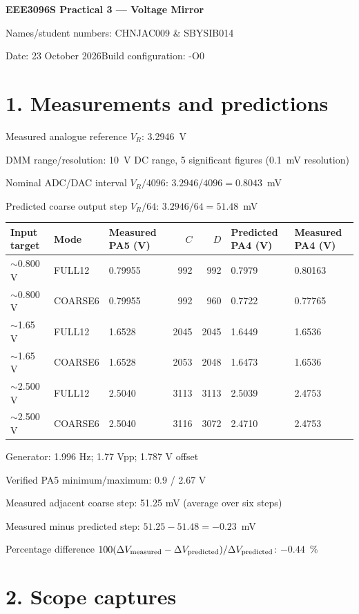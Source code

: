 \documentclass[11pt,a4paper]{article}
\begin{document}
\begin{center}
  {\Large\bfseries EEE3096S Practical 3 --- Voltage Mirror}
\end{center}
Names/student numbers: CHNJAC009 & SBYSIB014\par
Date: 23 October 2026\qquad Build configuration: -O0

\section*{1. Measurements and predictions}
Measured analogue reference $V_R$: 3.2946~V\par
DMM range/resolution: 10~V DC range, 5 significant figures (0.1~mV resolution)\par
Nominal ADC/DAC interval $V_R/4096$: $3.2946/4096 = 0.8043$~mV\par
Predicted coarse output step $V_R/64$: $3.2946/64 = 51.48$~mV

{\small
\begin{tabularx}{\linewidth}{@{}l l X r r X X@{}}
\toprule
Input target & Mode & Measured PA5 (V) & $C$ & $D$ & Predicted PA4 (V) & Measured PA4 (V) \\
\midrule
$\sim$0.800 V & FULL12  & 0.79955 & 992 & 992 & 0.7979 & 0.80163\\
$\sim$0.800 V & COARSE6 & 0.79955 & 992& 960 & 0.7722 & 0.77765\\
$\sim$1.65 V & FULL12  & 1.6528 & 2045 & 2045 & 1.6449 & 1.6536\\
$\sim$1.65 V & COARSE6 & 1.6528 & 2053 & 2048 & 1.6473 & 1.6536\\
$\sim$2.500 V & FULL12  & 2.5040 & 3113 & 3113& 2.5039 & 2.4753\\
$\sim$2.500 V & COARSE6 & 2.5040 & 3116 & 3072 & 2.4710 & 2.4753\\
\bottomrule
\end{tabularx}}

Generator: 1.996 Hz; 1.77 Vpp; 1.787 V offset\par
Verified PA5 minimum/maximum: 0.9 / 2.67 V\par
Measured adjacent coarse step: 51.25 mV (average over six steps)\par
Measured minus predicted step: $51.25 - 51.48 = -0.23$~mV\par
Percentage difference $100(\Delta V_{\rm measured}-\Delta V_{\rm predicted})/
\Delta V_{\rm predicted}$: $-0.44$~\%

\newpage
\section*{2. Scope captures}
\end{document}
